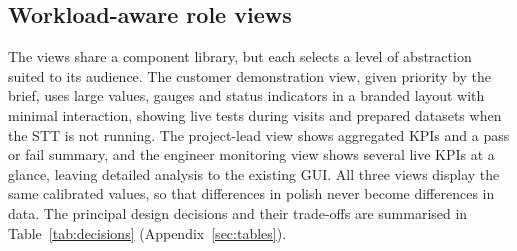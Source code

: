 \subsection{Workload-aware role views}\label{subsec:role-views}
The views share a component library, but each selects a level of abstraction suited to its audience.
The customer demonstration view, given priority by the brief, uses large values, gauges and status indicators in a branded layout with minimal interaction, showing live tests during visits and prepared datasets when the STT is not running.
The project-lead view shows aggregated KPIs and a pass or fail summary, and the engineer monitoring view shows several live KPIs at a glance, leaving detailed analysis to the existing GUI\@.
All three views display the same calibrated values, so that differences in polish never become differences in data.
The principal design decisions and their trade-offs are summarised in Table~\ref{tab:decisions} (Appendix~\ref{sec:tables}).

